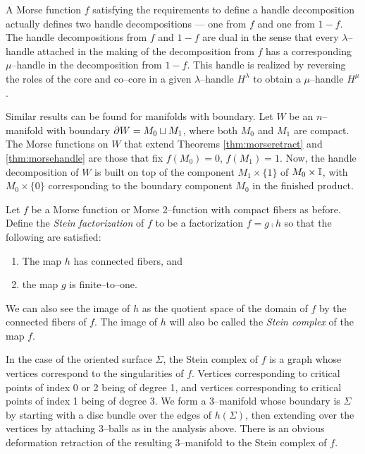 A Morse function $f$ satisfying the requirements to define a handle decomposition actually defines two handle decompositions --- one from $f$ and one from $1-f$.
The handle decompositions from $f$ and $1-f$ are dual in the sense that every $\lambda$--handle attached in the making of the decomposition from $f$ has a corresponding $\mu$--handle in the decomposition from $1-f$.
This handle is realized by reversing the roles of the core and co--core in a given $\lambda$--handle $H^\lambda$ to obtain a $\mu$--handle $H^\mu$.

Similar results can be found for manifolds with boundary.
Let $W$ be an $n$--manifold with boundary $\partial W = M_0\sqcup M_1$, where both $M_0$ and $M_1$ are compact.
The Morse functions on $W$ that extend Theorems \ref{thm:morseretract} and \ref{thm:morsehandle} are those that fix $f(M_0)=0$, $f(M_1)=1$.
Now, the handle decomposition of $W$ is built on top of the component $M_1\times\{1\}$ of $M_0\times\mathbb{I}$, with $M_0\times\{0\}$ corresponding to the boundary component $M_0$ in the finished product.




\begin{defn}
	\label{def:steinfactorization}
\end{defn}

\begin{defn}
	\label{def:steincomplex}
\end{defn}



Let $f$ be a Morse function or Morse 2--function with compact fibers as before.
Define the \emph{Stein factorization} of $f$ to be a factorization $f=g\comp h$ so that the following are satisfied:
\begin{enumerate}
	\item The map $h$ has connected fibers, and
	\item the map $g$ is finite--to--one.
\end{enumerate}
We can also see the image of $h$ as the quotient space of the domain of $f$ by the connected fibers of $f$.
The image of $h$ will also be called the \emph{Stein complex} of the map $f$.

In the case of the oriented surface $\Sigma$, the Stein complex of $f$ is a graph whose vertices correspond to the singularities of $f$.
Vertices corresponding to critical points of index 0 or 2 being of degree 1, and vertices corresponding to critical points of index 1 being of degree 3.
We form a 3--manifold whose boundary is $\Sigma$ by starting with a disc bundle over the edges of $h(\Sigma)$, then extending over the vertices by attaching 3--balls as in the analysis above.
There is an obvious deformation retraction of the resulting 3--manifold to the Stein complex of $f$.

